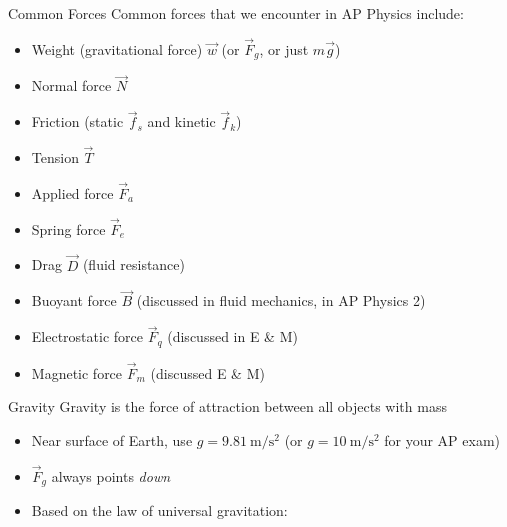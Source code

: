 \documentclass[12pt,compress,aspectratio=169]{beamer}
\begin{document}
\begin{frame}{Common Forces}
  Common forces that we encounter in AP Physics include:
  \begin{itemize}
  \item Weight (gravitational force) $\vec w$ (or $\vec F_g$, or just $m\vec g$)
  \item Normal force $\vec N$
  \item Friction (static $\vec f_s$ and kinetic $\vec f_k$)
  \item Tension $\vec T$
  \item Applied force $\vec F_a$
  \item Spring force $\vec F_e$
  \item Drag $\vec D$ (fluid resistance)
  \item Buoyant force $\vec B$ (discussed in fluid mechanics, in AP Physics 2)
  \item Electrostatic force $\vec F_q$ (discussed in E \& M)
  \item Magnetic force $\vec F_m$ (discussed E \& M)
  \end{itemize}
\end{frame}



\begin{frame}{Gravity}
  Gravity is the force of attraction between all objects with mass
    
  \begin{itemize}
  \item Near surface of Earth, use $g=\SI{9.81}{\metre\per\second\squared}$ (or
    $g=\SI{10}{\metre\per\second\squared}$ for your AP exam)
  \item $\vec F_g$ always points \emph{down}
  \item Based on the law of universal gravitation:

  \end{itemize}    
\end{frame}
\end{document}
